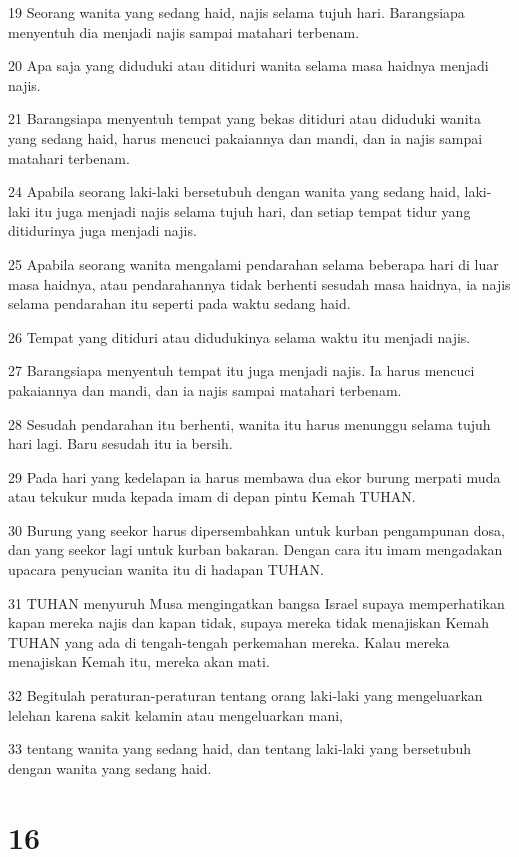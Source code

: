 \par 19 Seorang wanita yang sedang haid, najis selama tujuh hari. Barangsiapa menyentuh dia menjadi najis sampai matahari terbenam.
\par 20 Apa saja yang diduduki atau ditiduri wanita selama masa haidnya menjadi najis.
\par 21 Barangsiapa menyentuh tempat yang bekas ditiduri atau diduduki wanita yang sedang haid, harus mencuci pakaiannya dan mandi, dan ia najis sampai matahari terbenam.
\par 24 Apabila seorang laki-laki bersetubuh dengan wanita yang sedang haid, laki-laki itu juga menjadi najis selama tujuh hari, dan setiap tempat tidur yang ditidurinya juga menjadi najis.
\par 25 Apabila seorang wanita mengalami pendarahan selama beberapa hari di luar masa haidnya, atau pendarahannya tidak berhenti sesudah masa haidnya, ia najis selama pendarahan itu seperti pada waktu sedang haid.
\par 26 Tempat yang ditiduri atau didudukinya selama waktu itu menjadi najis.
\par 27 Barangsiapa menyentuh tempat itu juga menjadi najis. Ia harus mencuci pakaiannya dan mandi, dan ia najis sampai matahari terbenam.
\par 28 Sesudah pendarahan itu berhenti, wanita itu harus menunggu selama tujuh hari lagi. Baru sesudah itu ia bersih.
\par 29 Pada hari yang kedelapan ia harus membawa dua ekor burung merpati muda atau tekukur muda kepada imam di depan pintu Kemah TUHAN.
\par 30 Burung yang seekor harus dipersembahkan untuk kurban pengampunan dosa, dan yang seekor lagi untuk kurban bakaran. Dengan cara itu imam mengadakan upacara penyucian wanita itu di hadapan TUHAN.
\par 31 TUHAN menyuruh Musa mengingatkan bangsa Israel supaya memperhatikan kapan mereka najis dan kapan tidak, supaya mereka tidak menajiskan Kemah TUHAN yang ada di tengah-tengah perkemahan mereka. Kalau mereka menajiskan Kemah itu, mereka akan mati.
\par 32 Begitulah peraturan-peraturan tentang orang laki-laki yang mengeluarkan lelehan karena sakit kelamin atau mengeluarkan mani,
\par 33 tentang wanita yang sedang haid, dan tentang laki-laki yang bersetubuh dengan wanita yang sedang haid.

\chapter{16}

